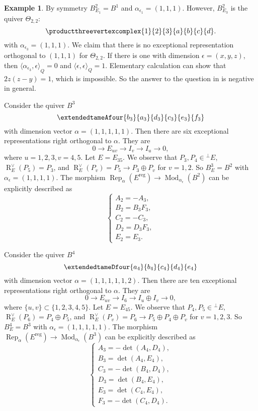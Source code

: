 \documentclass{amsart}
\theoremstyle{definition}
\newtheorem{example}[theorem]{Example}
\theoremstyle{remark}
\numberwithin{equation}{section}
\begin{document}
\begin{example}
By symmetry $B^2_{E_1}=B^1$ and $\alpha_{\epsilon_1}=(1,1,1)$. However, $B^2_{E_3}$ is the quiver $\Theta_{2,2}:$
$$\productthreevertexcomplex{1}{2}{3}{a}{b}{c}{d}.$$ with $\alpha_{\epsilon_3}=(1,1,1)$. We claim that there is no exceptional representation orthogonal to $(1,1,1)$ for $\Theta_{2,2}$. If there is one with dimension $\epsilon=(x,y,z)$, then ${\langle{\alpha_{\epsilon_3},\epsilon}\rangle}_Q=0$ and ${\langle{\epsilon,\epsilon}\rangle}_Q=1$. Elementary calculation can show that $2z(z-y)=1$, which is impossible. So the answer to the question in \cite[introduction]{S3} is negative in general.

Consider the quiver $B^3$
$$\extendedtameAfour{b_3}{a_3}{d_3}{c_3}{e_3}{f_3}$$ with dimension vector $\alpha=(1,1,1,1,1)$.
Then there are six exceptional representations right orthogonal to $\alpha$. They are $$0\to E_{uv} \to I_v\to I_u\to 0,$$ where $u=1,2,3,v=4,5$.
Let $E=E_{35}$. We observe that $P_3,P_4\in {{^\perp}\!} E$, ${\operatorname{R}}_{E}^\vee(P_5)=P_3$, and ${\operatorname{R}}_{E}^\vee(P_v)=P_5\to P_3\oplus P_v$ for $v=1,2$. So $B^3_{E}=B^2$ with $\alpha_\epsilon=(1,1,1,1)$. The morphism ${\operatorname{Rep}}_\alpha(E^{{\operatorname{reg}}})\to{\operatorname{Mod}}_{\alpha_\epsilon}(B^2)$ can be explicitly described as $$\begin{cases}
A_2=-A_3,\\ B_2=B_3F_3,\\ C_2=-C_3,\\ D_2=D_3F_3,\\ E_2=E_3.\end{cases}$$

Consider the quiver $B^4$
$$\extendedtameDfour{a_4}{b_4}{c_4}{d_4}{e_4}$$ with dimension vector $\alpha=(1,1,1,1,1,2)$.
Then there are ten exceptional representations right orthogonal to $\alpha$. They are $$0\to E_{uv}\to I_6\to I_u\oplus I_v\to 0,$$ where $\{u,v\}\subset\{1,2,3,4,5\}$.
Let $E=E_{45}$. We observe that $P_4,P_5\in {{^\perp}\!} E$, ${\operatorname{R}}_{E}^\vee(P_6)=P_4\oplus P_5$, and ${\operatorname{R}}_{E}^\vee(P_v)=P_6\to P_5\oplus P_4\oplus P_v$ for $v=1,2,3$. So $B^4_{E}=B^3$ with $\alpha_\epsilon=(1,1,1,1,1)$. The morphism ${\operatorname{Rep}}_\alpha(E^{{\operatorname{reg}}})\to{\operatorname{Mod}}_{\alpha_\epsilon}(B^3)$ can be explicitly described as $$\begin{cases}
A_3=-\det(A_4,D_4),\\
B_3=\det(A_4,E_4),\\
C_3=-\det(B_4,D_4),\\
D_3=\det(B_4,E_4),\\
E_3=\det(C_4,E_4),\\
F_3=-\det(C_4,D_4).\end{cases}$$
\end{example}
\end{document}
